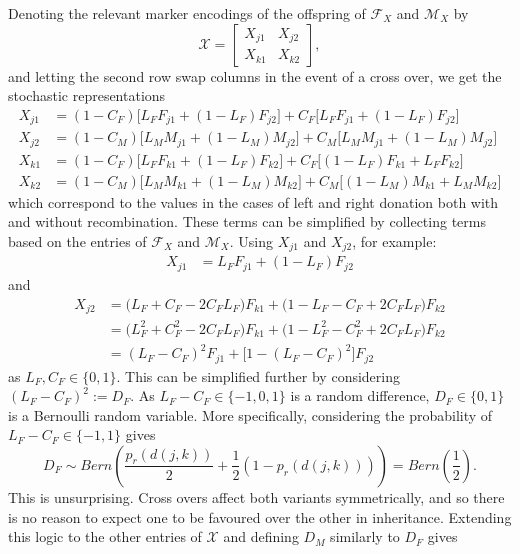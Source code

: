 \documentclass{article}
\begin{document}
Denoting the relevant marker encodings of the offspring of $\mathcal{F}_X$ and $\mathcal{M}_X$ by
\begin{equation} \label{eq:randomOff}
  \mathcal{X} = \begin{bmatrix}
    X_{j1} & X_{j2} \\
    X_{k1} & X_{k2}
  \end{bmatrix},
\end{equation}
and letting the second row swap columns in the event of a cross over, we get the stochastic representations
\begin{align*}
  X_{j1} & =  (1 - C_F)\Big [L_F F_{j1} + (1 - L_F) F_{j2} \Big ] + C_F \Big [ L_F F_{j1} + (1 - L_F) F_{j2} \Big ] \\
  X_{j2} & =  (1 - C_M)\Big [L_M M_{j1} + (1 - L_M) M_{j2} \Big ] + C_M \Big [ L_M M_{j1} + (1 - L_M) M_{j2} \Big ] \\
  X_{k1} & =  (1 - C_F)\Big [L_F F_{k1} + (1 - L_F) F_{k2} \Big ] + C_F \Big [ (1 - L_F) F_{k1} + L_F F_{k2} \Big ] \\
  X_{k2} & =  (1 - C_M)\Big [L_M M_{k1} + (1 - L_M) M_{k2} \Big ] + C_M \Big [ (1 - L_M) M_{k1} + L_M M_{k2} \Big ] 
\end{align*}
which correspond to the values in the cases of left and right donation both with and without recombination. These terms can be simplified by collecting terms based on the entries of $\mathcal{F}_X$ and $\mathcal{M}_X$. Using $X_{j1}$ and $X_{j2}$, for example:
\begin{align*}
  X_{j1} & = L_F  F_{j1} + (1 - L_F) F_{j2}
\end{align*}
and
\begin{align*}
  X_{j2} & = \Big ( L_F + C_F - 2 C_F L_F \Big ) F_{k1} + \Big ( 1 - L_F - C_F + 2 C_F L_F \Big ) F_{k2} \\
         & = \Big ( L_F^2 + C_F^2 - 2 C_F L_F \Big ) F_{k1} + \Big ( 1 - L_F^2 - C_F^2 + 2 C_F L_F \Big ) F_{k2} \\
  & = ( L_F - C_F )^2 F_{j1} + \Big [ 1 - ( L_F - C_F )^2 \Big ] F_{j2} 
\end{align*}
as $L_F, C_F \in \{0,1\}$. This can be simplified further by considering $(L_F - C_F)^2 := D_F$. As $L_F - C_F \in \{-1,0,1\}$ is a random difference, $D_F \in \{0, 1\}$ is a Bernoulli random variable. More specifically, considering the probability of $L_F - C_F \in \{-1, 1\}$ gives
$$D_F \sim Bern \left( \frac{p_r(d(j,k))}{2} + \frac{1}{2}( 1 - p_r(d(j,k)) ) \right ) = Bern \left ( \frac{1}{2} \right ).$$
This is unsurprising. Cross overs affect both variants symmetrically, and so there is no reason to expect one to be favoured over the other in inheritance. Extending this logic to the other entries of $\mathcal{X}$ and defining $D_M$ similarly to $D_F$ gives
\end{document}
